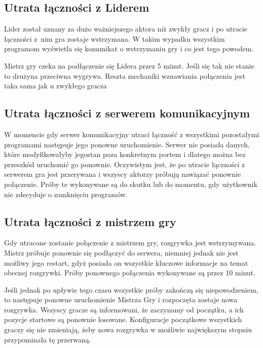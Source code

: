 \documentclass[a4paper]{article}
\begin{document}
\subsection{Utrata łączności z Liderem}
Lider został uznany za dużo ważniejszego aktora niż zwykły gracz i po utracie łączności z~nim gra zostaje wstrzymana. W takim wypadku wszystkim programom wyświetla się komunikat o wstrzymaniu gry i co jest tego powodem. 

Mistrz gry czeka na podłączenie się Lidera przez 5 minut. Jeśli się tak nie stanie to drużyna przeciwna wygrywa. Reszta mechaniki wznawiania połączenia jest taka sama jak u zwykłego gracza


\subsection{Utrata łączności z serwerem komunikacyjnym}
W momencie gdy serwer komunikacyjny utraci łączność z wszystkimi pozostałymi programami następuje jego ponowne uruchomienie. Serwer nie posiada danych, które modyfikowałyby jegostan poza konkretnym portem i dlatego można bez przeszkód uruchomić go ponownie. Oczywistym jest, że po utracie łączności z serwerem gra jest przerywana i wszyscy aktorzy próbują nawiązać ponownie połączenie. Próby te wykonywane są do skutku lub do momentu, gdy użytkownik nie zdecyduje o zamknięciu programów. 

\subsection{Utrata łączności z mistrzem gry}
Gdy utracone zostanie połączenie z mistrzem gry, rozgrywka jest wstrzymywana. Mistrz próbuje ponownie się podłączyć do serwera, niemniej jednak nie jest możliwy jego restart, gdyż posiada on wszystkie kluczowe informacje na temat obecnej rozgrywki. Próby ponownego połączenia wykonywane są przez 10 minut. 

Jeśli jednak po upływie tego czasu wszystkie próby zakończą się niepowodzeniem, to następuje ponowne uruchomienie Mistrza Gry i rozpoczęta zostaje nowa rozgrywka. Wszyscy gracze są informowani, że zaczynamy od początku, a ich pozycje startowe są ponownie losowane. Konfiguracje początkowe wszystkich graczy się nie zmieniają, żeby nowa rozgrywka w możliwie największym stopniu przypominała tę przerwaną. 
\end{document}

